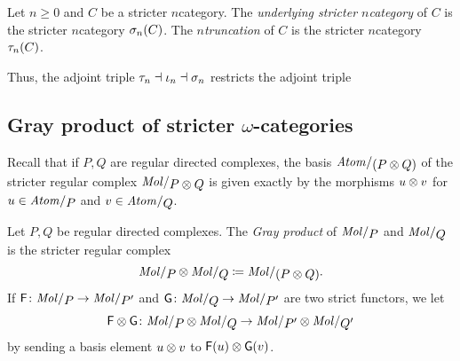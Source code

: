 \begin{dfn}
    Let \( n \geq 0 \) and \( C \) be a stricter \( n \)\nbd category.
    The \emph{underlying stricter \( n \)\nbd category} of \( C \) is the stricter \( n \)\nbd category \( \sigma_{n}(C) \).
    The \emph{\( n \)\nbd truncation} of \( C \) is the stricter \( n \)\nbd category \( \tau_{n}(C) \).
\end{dfn}

\noindent Thus, the adjoint triple \( \tau_{n} \dashv \iota_n \dashv \sigma_{n} \) restricts the adjoint triple
\begin{center}
\end{center}

\subsection{Gray product of stricter \texorpdfstring{$\omega$}{}-categories}

Recall that if \( P, Q \) are regular directed complexes, the basis \( \atomin{(P \gray Q)} \) of the stricter regular complex \( \molecin{P \gray Q} \) is given exactly by the morphisms \( u \otimes v \) for \( u \in \atomin{P} \) and \( v \in \atomin{Q} \).  

\begin{dfn}  \label{dfn:gray_product_of_stricter_regular_complexes}
    Let \( P, Q \) be regular directed complexes.
    The \emph{Gray product} of \( \molecin{P} \) and \( \molecin{Q} \) is the stricter regular complex
    \begin{equation*}
        \molecin{P} \gray \molecin{Q} \eqdef \molecin{(P \gray Q)}.
    \end{equation*}
    If \( \F \colon \molecin{P} \to \molecin{P'} \) and \( \G \colon \molecin{Q} \to \molecin{P'} \) are two strict functors, we let 
    \begin{equation*}
        \F \gray \G \colon \molecin{P} \gray \molecin{Q} \to  \molecin{P'} \gray \molecin{Q'}
    \end{equation*}
    by sending a basis element \( u \otimes v \) to \( \mathsf{F}(u) \otimes \mathsf{G}(v) \).
\end{dfn}

